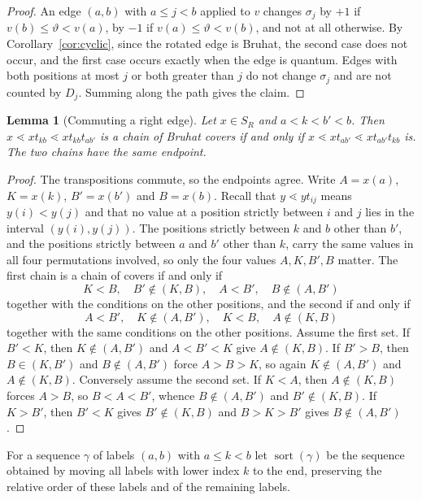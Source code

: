 \documentclass[11pt]{article}
\newtheorem{lemma}[proposition]{Lemma}
\begin{document}
\begin{proof}
An edge $(a,b)$ with $a\leq j<b$ applied to $v$ changes $\sigma_j$ by
$+1$ if $v(b)\leq\vartheta<v(a)$, by $-1$ if $v(a)\leq\vartheta<v(b)$,
and not at all otherwise. By Corollary~\ref{cor:cyclic}, since the
rotated edge is Bruhat, the second case does not occur, and the first
case occurs exactly when the edge is quantum. Edges with both
positions at most $j$ or both greater than $j$ do not change
$\sigma_j$ and are not counted by $D_j$. Summing along the path gives
the claim.
\end{proof}

\begin{lemma}[Commuting a right edge]\label{lem:commute}
Let $x\in S_R$ and $a<k<b'<b$. Then
$x\lessdot xt_{kb}\lessdot xt_{kb}t_{ab'}$ is a chain of Bruhat covers
if and only if $x\lessdot xt_{ab'}\lessdot xt_{ab'}t_{kb}$ is. The two
chains have the same endpoint.
\end{lemma}

\begin{proof}
The transpositions commute, so the endpoints agree. Write
$A=x(a)$, $K=x(k)$, $B'=x(b')$ and $B=x(b)$. Recall that
$y\lessdot yt_{ij}$ means $y(i)<y(j)$ and that no value at a position
strictly between $i$ and $j$ lies in the interval $(y(i),y(j))$. The
positions strictly between $k$ and $b$ other than $b'$, and the
positions strictly between $a$ and $b'$ other than $k$, carry the same
values in all four permutations involved, so only the four values
$A,K,B',B$ matter. The first chain is a chain of covers if and only if
\[
 K<B,\quad B'\notin(K,B),\quad A<B',\quad B\notin(A,B')
\]
together with the conditions on the other positions, and the second
if and only if
\[
 A<B',\quad K\notin(A,B'),\quad K<B,\quad A\notin(K,B)
\]
together with the same conditions on the other positions. Assume the
first set. If $B'<K$, then $K\notin(A,B')$ and $A<B'<K$ give
$A\notin(K,B)$. If $B'>B$, then $B\in(K,B')$ and $B\notin(A,B')$ force
$A>B>K$, so again $K\notin(A,B')$ and $A\notin(K,B)$. Conversely assume
the second set. If $K<A$, then $A\notin(K,B)$ forces $A>B$, so
$B<A<B'$, whence $B\notin(A,B')$ and $B'\notin(K,B)$. If $K>B'$, then
$B'<K$ gives $B'\notin(K,B)$ and $B>K>B'$ gives $B\notin(A,B')$.
\end{proof}

For a sequence $\gamma$ of labels $(a,b)$ with $a\leq k<b$ let
$\operatorname{sort}(\gamma)$ be the sequence obtained by moving all
labels with lower index $k$ to the end, preserving the relative order
of these labels and of the remaining labels.
\end{document}
